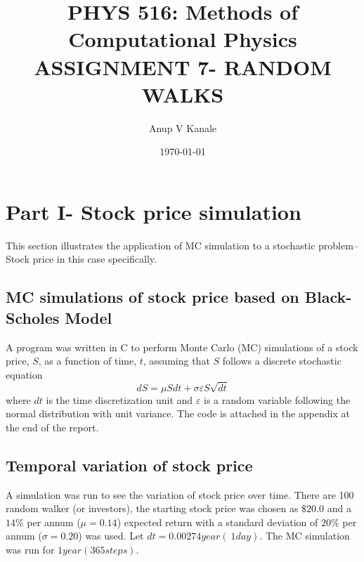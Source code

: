 \documentclass[11pt, oneside]{article}   	%
\title{\vspace{-6ex}\large PHYS 516: Methods of Computational Physics \\ [1ex]
 ASSIGNMENT 7- RANDOM WALKS\vspace{-3ex}}
\author{Anup V Kanale}
\date{\vspace{-3ex}\today}							%
\begin{document}
\vspace{-6ex}\maketitle

\section{Part I- Stock price simulation}
This section illustrates the application of MC simulation to a stochastic problem-- Stock price in this case specifically.

\subsection{MC simulations of stock price based on Black-Scholes Model}	
A program was written in C to perform Monte Carlo (MC) simulations of a stock price, $S$, as a function of time, $t$, assuming that $S$ follows a discrete stochastic equation
	\begin{equation}
		dS = \mu S dt + \sigma \varepsilon S \sqrt{dt}
	\end{equation}
where $dt$ is the time discretization unit and $\varepsilon$ is a random variable following the normal distribution with unit variance. The code is attached in the appendix at the end of the report.

\subsection{Temporal variation of stock price}
A simulation was run to see the variation of stock price over time. There are 100 random walker (or investors), the starting stock price was chosen as $\$20.0$ and a $14 \%$ per annum ($\mu = 0.14$) expected return with a standard deviation of $20\%$ per annum ($\sigma = 0.20$) was used. Let $dt = 0.00274 year (~1 day)$. The MC simulation was run for $1 year (365 steps)$.
\end{document}
